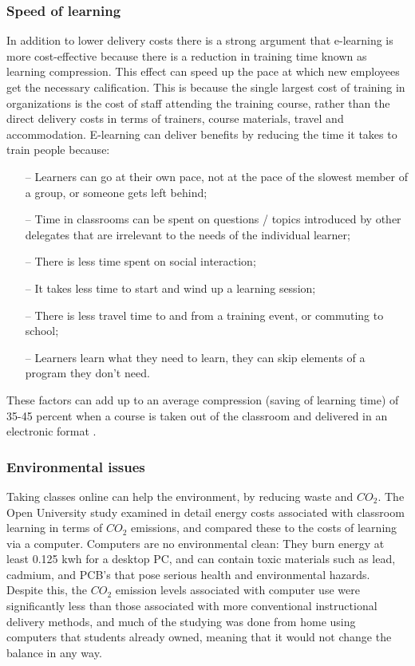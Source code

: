 \subsubsection{Speed of learning}
In addition to lower delivery costs there is a
strong argument that e-learning is more cost-effective because there is a
reduction in training time known as learning compression. This effect can speed
up the pace at which new employees get the necessary calification. This is
because the single largest cost of training in organizations is the cost of
staff attending the training course, rather than the direct delivery costs in
terms of trainers, course materials, travel and accommodation. E-learning can
deliver benefits by reducing the time it takes to train people because:
\begin{enumerate}
    \item[--] Learners can go at their own pace, not at the pace of the slowest member of a group, or someone gets left behind;
    \item[--] Time in classrooms can be spent on questions / topics introduced by other delegates that are irrelevant to the needs of the individual learner;
    \item[--] There is less time spent on social interaction;
    \item[--] It takes less time to start and wind up a learning session;
    \item[--] There is less travel time to and from a training event, or commuting to school;
    \item[--] Learners learn what they need to learn, they can skip elements of a program they don’t need.
\end{enumerate}
These factors can add up to an average compression (saving of learning time) of
35-45 percent when a course is taken out of the classroom and delivered in an
electronic format \citep{brandonhall}.

\subsubsection{Environmental issues}
Taking classes online can help the environment, by reducing waste and $ CO_{2} $.  The
Open University study \citep{openuniversity} examined in detail energy costs associated with classroom
learning in terms of $ CO_{2} $ emissions, and compared these to the costs of learning
via a computer. Computers are no environmental clean: They burn energy at least
0.125 kwh for a desktop PC, and can contain toxic materials such as lead,
cadmium, and PCB’s that pose serious health and environmental hazards. Despite
this, the $ CO_{2} $ emission levels associated with computer use were significantly
less than those associated with more conventional instructional delivery
methods, and much of the studying was done from home using computers that
students already owned, meaning that it would not change the balance in any way.

